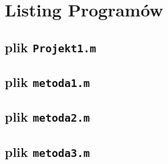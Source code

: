 \documentclass[a4paper, 12pt, twoside, openany]{article}
\begin{document}
    \newpage

    \section*{Listing Programów}

    \subsection*{plik \texttt{Projekt1.m}}
    
    \subsection*{plik \texttt{metoda1.m}}
    
    \subsection*{plik \texttt{metoda2.m}}
    
    \subsection*{plik \texttt{metoda3.m}}
    
\end{document}
